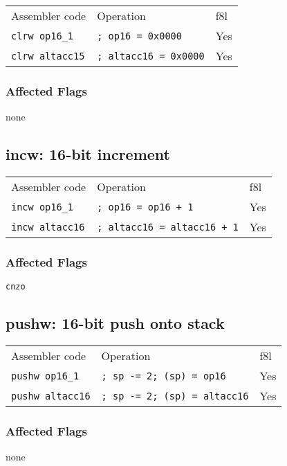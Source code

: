 \documentclass{book}
\begin{document}
\begin{tabular}{l l l}
Assembler code         & Operation                    & f8l \\
\texttt{clrw op16\_1}  & \texttt{; op16 = 0x0000}     & Yes \\
\texttt{clrw altacc15} & \texttt{; altacc16 = 0x0000} & Yes
\end{tabular}

\subsubsection*{Affected Flags}

none


\subsection{incw: 16-bit increment}

\begin{tabular}{l l l}
Assembler code         & Operation                          & f8l \\
\texttt{incw op16\_1}  & \texttt{; op16 = op16 + 1}         & Yes \\
\texttt{incw altacc16} & \texttt{; altacc16 = altacc16 + 1} & Yes
\end{tabular}

\subsubsection*{Affected Flags}

\texttt{cnzo}


\subsection{pushw: 16-bit push onto stack}

\begin{tabular}{l l l}
Assembler code          & Operation                           & f8l \\
\texttt{pushw op16\_1}  & \texttt{; sp -= 2; (sp) = op16}     & Yes \\
\texttt{pushw altacc16} & \texttt{; sp -= 2; (sp) = altacc16} & Yes
\end{tabular}

\subsubsection*{Affected Flags}

none
\end{document}
